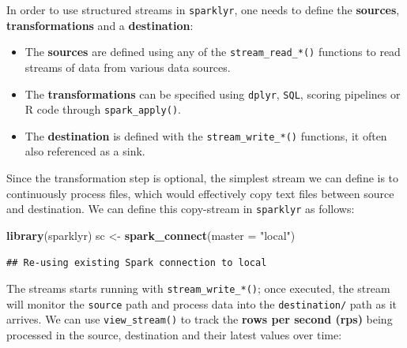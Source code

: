 \documentclass[]{book}
\newenvironment{Shaded}{\begin{snugshade}}{\end{snugshade}}
\newcommand{\DataTypeTok}[1]{\textcolor[rgb]{0.13,0.29,0.53}{#1}}
\newcommand{\KeywordTok}[1]{\textcolor[rgb]{0.13,0.29,0.53}{\textbf{#1}}}
\newcommand{\NormalTok}[1]{#1}
\newcommand{\OperatorTok}[1]{\textcolor[rgb]{0.81,0.36,0.00}{\textbf{#1}}}
\newcommand{\StringTok}[1]{\textcolor[rgb]{0.31,0.60,0.02}{#1}}
\providecommand{\tightlist}{%
  \setlength{\itemsep}{0pt}\setlength{\parskip}{0pt}}
\theoremstyle{definition}
\theoremstyle{definition}
\theoremstyle{definition}
\theoremstyle{remark}
\begin{document}
In order to use structured streams in \texttt{sparklyr}, one needs to
define the \textbf{sources}, \textbf{transformations} and a
\textbf{destination}:

\begin{itemize}
\tightlist
\item
  The \textbf{sources} are defined using any of the
  \texttt{stream\_read\_*()} functions to read streams of data from
  various data sources.
\item
  The \textbf{transformations} can be specified using \texttt{dplyr},
  \texttt{SQL}, scoring pipelines or R code through
  \texttt{spark\_apply()}.
\item
  The \textbf{destination} is defined with the
  \texttt{stream\_write\_*()} functions, it often also referenced as a
  sink.
\end{itemize}

Since the transformation step is optional, the simplest stream we can
define is to continuously process files, which would effectively copy
text files between source and destination. We can define this
copy-stream in \texttt{sparklyr} as follows:

\begin{Shaded}
\begin{Highlighting}[]
\KeywordTok{library}\NormalTok{(sparklyr)}
\NormalTok{sc <-}\StringTok{ }\KeywordTok{spark_connect}\NormalTok{(}\DataTypeTok{master =} \StringTok{"local"}\NormalTok{)}
\end{Highlighting}
\end{Shaded}

\begin{verbatim}
## Re-using existing Spark connection to local
\end{verbatim}

\begin{Shaded}
\end{Shaded}

The streams starts running with \texttt{stream\_write\_*()}; once
executed, the stream will monitor the \texttt{source} path and process
data into the \texttt{destination/} path as it arrives. We can use
\texttt{view\_stream()} to track the \textbf{rows per second (rps)}
being processed in the source, destination and their latest values over
time:
\end{document}
